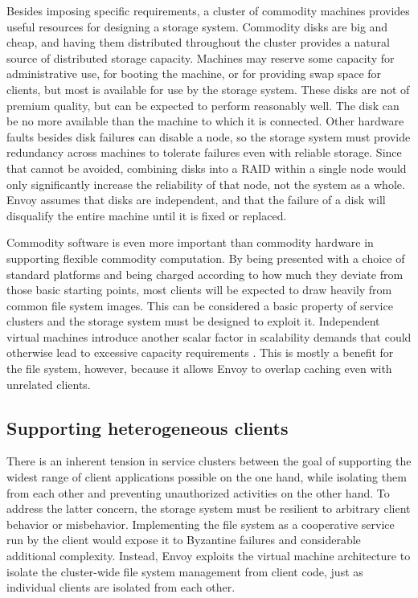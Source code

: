 Besides imposing specific requirements, a cluster of commodity machines provides useful resources for designing a storage system. Commodity disks are big and cheap, and having them distributed throughout the cluster provides a natural source of distributed storage capacity. Machines may reserve some capacity for administrative use, for booting the machine, or for providing swap space for clients, but most is available for use by the storage system. These disks are not of premium quality, but can be expected to perform reasonably well. The disk can be no more available than the machine to which it is connected. Other hardware faults besides disk failures can disable a node, so the storage system must provide redundancy across machines to tolerate failures even with reliable storage. Since that cannot be avoided, combining disks into a RAID within a single node would only significantly increase the reliability of that node, not the system as a whole. Envoy assumes that disks are independent, and that the failure of a disk will disqualify the entire machine until it is fixed or replaced.

Commodity software is even more important than commodity hardware in supporting flexible commodity computation. By being presented with a choice of standard platforms and being charged according to how much they deviate from those basic starting points, most clients will be expected to draw heavily from common file system images. This can be considered a basic property of service clusters and the storage system must be designed to exploit it. Independent virtual machines introduce another scalar factor in scalability demands that could otherwise lead to excessive capacity requirements \cite{warfield}. This is mostly a benefit for the file system, however, because it allows Envoy to overlap caching even with unrelated clients.

\subsection{Supporting heterogeneous clients}

There is an inherent tension in service clusters between the goal of supporting the widest range of client applications possible on the one hand, while isolating them from each other and preventing unauthorized activities on the other hand. To address the latter concern, the storage system must be resilient to arbitrary client behavior or misbehavior. Implementing the file system as a cooperative service run by the client would expose it to Byzantine failures and considerable additional complexity. Instead, Envoy exploits the virtual machine architecture to isolate the cluster-wide file system management from client code, just as individual clients are isolated from each other.

